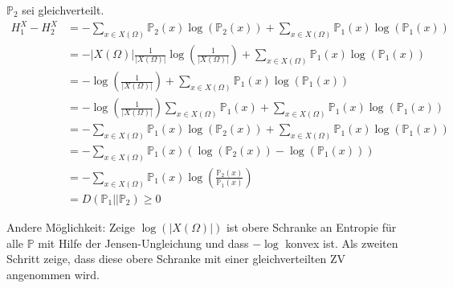 \documentclass{scrartcl}
\newcommand{\Prob}{\mathbb{P}}
\begin{document}
$\Prob_2$ sei gleichverteilt.
\begin{align*}
    H_1^X - H_2^X & = -\sum_{x \in X(\Omega)} \Prob_2(x)\log(\Prob_2(x)) + \sum_{x \in X(\Omega)} \Prob_1(x)\log(\Prob_1(x)) \\
                  & = -|X(\Omega)| \frac{1}{|X(\Omega)|} \log\left(\frac{1}{|X(\Omega)|}\right) + \sum_{x \in X(\Omega)} \Prob_1(x)\log(\Prob_1(x)) \\
                  & = -\log(\frac{1}{|X(\Omega)|}) + \sum_{x \in X(\Omega)} \Prob_1(x)\log(\Prob_1(x)) \\
                  & = -\log(\frac{1}{|X(\Omega)|}) \sum_{x \in X(\Omega)} \Prob_1(x) + \sum_{x \in X(\Omega)} \Prob_1(x)\log(\Prob_1(x)) \\
                  & = -\sum_{x \in X(\Omega)} \Prob_1(x) \log(\Prob_2(x)) + \sum_{x \in X(\Omega)} \Prob_1(x)\log(\Prob_1(x)) \\
                  & = -\sum_{x \in X(\Omega)} \Prob_1(x) \left(\log(\Prob_2(x)) - \log(\Prob_1(x))\right) \\
                  & = -\sum_{x \in X(\Omega)} \Prob_1(x) \log\left(\frac{\Prob_2(x)}{\Prob_1(x)}\right) \\
                  & = D(\Prob_1 || \Prob_2) \ge 0
\end{align*}

Andere Möglichkeit:
Zeige $\log(|X(\Omega)|)$ ist obere Schranke an Entropie für alle $\Prob$ mit
Hilfe der Jensen-Ungleichung und dass $-\log$ konvex ist. Als zweiten Schritt
zeige, dass diese obere Schranke mit einer gleichverteilten ZV angenommen wird.
\end{document}
